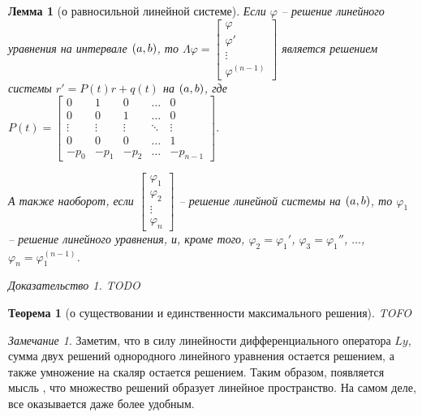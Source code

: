\documentclass[a5paper, 10pt]{article}
\theoremstyle{definition}
\theoremstyle{plain}
\newtheorem{Th}{Теорема}
\newtheorem{Lem}{Лемма}
\theoremstyle{remark}
\newtheorem*{Note}{Замечание}
\newtheorem*{Proof}{Доказательство}
\begin{document}
		\begin{Lem}[о равносильной линейной системе]
			Если $\varphi$ -- решение линейного уравнения на интервале $\left(a,b\right)$, то $\Lambda \varphi = \begin{bmatrix}
				\varphi\\\varphi'\\\vdots\\\varphi^{(n-1)}
			\end{bmatrix}
		$ является решением системы $r'=P(t) r + q(t)$ на $\left(a,b\right)$, где $P(t) = \begin{bmatrix}
			0 & 1 & 0 & \dots & 0\\
			0 & 0 & 1 & \dots & 0\\
			\vdots & \vdots & \vdots &\ddots & \vdots\\
			0 & 0 & 0 & \dots & 1\\
			-p_0 & -p_1 & -p_2 & \dots & -p_{n-1}
		\end{bmatrix}
	$.
	
	А также наоборот, если $\begin{bmatrix}
		\varphi_1 \\ \varphi_2 \\ \vdots \\ \varphi_n
	\end{bmatrix}$ -- решение линейной системы на $\left(a,b\right)$, то $\varphi_1$ -- решение линейного уравнения, и, кроме того, $\varphi_2 = \varphi_1'$, $\varphi_3 = \varphi_1''$, $\dots$, $\varphi_n = \varphi_1^{(n-1)}$. 
	
		\begin{Proof}
			TODO
		\end{Proof}
		\end{Lem}
	
	\begin{Th}[о существовании и единственности максимального решения]
		TOFO
	\end{Th}

	\begin{Note}
		Заметим, что в силу линейности дифференциального оператора $Ly$, сумма двух решений однородного линейного уравнения остается решением, а также умножение на скаляр остается решением. Таким образом, появляется  мысль , что множество решений образует линейное пространство. На самом деле, все оказывается даже более удобным.
	\end{Note}
\end{document}
